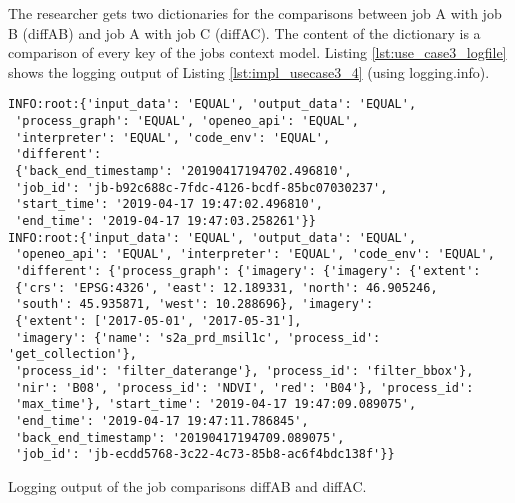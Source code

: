 \documentclass[draft,final]{vutinfth} %
\newenvironment{code}{\captionsetup{type=listing}}{}
\begin{document}
\begin{enumerate}
\begin{code}
	\end{code}

	The researcher gets two dictionaries for the comparisons between job A with job B (diffAB) and job A with job C (diffAC). The content of the dictionary is a comparison of every key of the jobs context model. Listing \ref{lst:use_case3_logfile} shows the logging output of Listing \ref{lst:impl_usecase3_4} (using logging.info).
\end{enumerate}


\begin{code}
	\begin{verbatim}
INFO:root:{'input_data': 'EQUAL', 'output_data': 'EQUAL', 
 'process_graph': 'EQUAL', 'openeo_api': 'EQUAL', 
 'interpreter': 'EQUAL', 'code_env': 'EQUAL',
 'different': 
 {'back_end_timestamp': '20190417194702.496810', 
 'job_id': 'jb-b92c688c-7fdc-4126-bcdf-85bc07030237', 
 'start_time': '2019-04-17 19:47:02.496810', 
 'end_time': '2019-04-17 19:47:03.258261'}} 
INFO:root:{'input_data': 'EQUAL', 'output_data': 'EQUAL', 
 'openeo_api': 'EQUAL', 'interpreter': 'EQUAL', 'code_env': 'EQUAL',
 'different': {'process_graph': {'imagery': {'imagery': {'extent': 
 {'crs': 'EPSG:4326', 'east': 12.189331, 'north': 46.905246, 
 'south': 45.935871, 'west': 10.288696}, 'imagery': 
 {'extent': ['2017-05-01', '2017-05-31'], 
 'imagery': {'name': 's2a_prd_msil1c', 'process_id': 'get_collection'}, 
 'process_id': 'filter_daterange'}, 'process_id': 'filter_bbox'}, 
 'nir': 'B08', 'process_id': 'NDVI', 'red': 'B04'}, 'process_id': 
 'max_time'}, 'start_time': '2019-04-17 19:47:09.089075', 
 'end_time': '2019-04-17 19:47:11.786845', 
 'back_end_timestamp': '20190417194709.089075', 
 'job_id': 'jb-ecdd5768-3c22-4c73-85b8-ac6f4bdc138f'}}
	\end{verbatim}
	\caption{Logging output of the job comparisons diffAB and diffAC.}
	\label{lst:use_case3_logfile}
\end{code}
\end{document}

